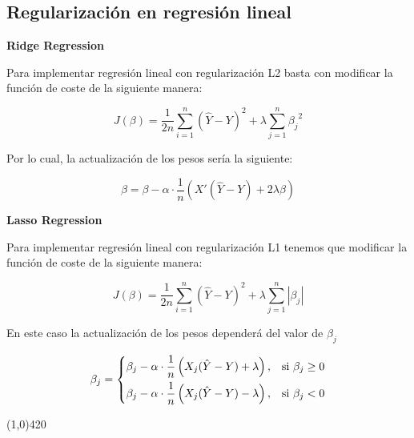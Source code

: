 \documentclass[11pt,fleqn]{book} %
\begin{document}
\FloatBarrier

\subsection{Regularización en regresión lineal} 

\textbf{Ridge Regression}

Para implementar regresión lineal con regularización L2 basta con modificar la función de coste de la siguiente manera:

\begin{equation}
\label{eqn:mean_squared_error_modified_l2}
J(\beta)=\frac{1}{2n} \sum_{i=1}^{n}\left (\hat{Y} - Y  \right )^{2} + \lambda \sum_{j=1}^{n} {\beta_{j}}^{2}
\end{equation}

Por lo cual, la actualización de los pesos sería la siguiente:

\begin{equation}
\label{eqn:linear_regression_gradient_descent_l2}
\beta = \beta - \alpha \cdot \frac{1}{n} \left ( X' (\hat{Y}-Y ) + 2 \lambda \beta \right )
\end{equation}

\textbf{Lasso Regression}

Para implementar regresión lineal con regularización L1 tenemos que modificar la función de coste de la siguiente manera:

\begin{equation}
\label{eqn:mean_squared_error_modified_l1}
J(\beta)=\frac{1}{2n} \sum_{i=1}^{n}\left (\hat{Y} - Y  \right )^{2} + \lambda \sum_{j=1}^{n} {|\beta_{j}|}
\end{equation}

En este caso la actualización de los pesos dependerá del valor de $\beta_{j}$

\begin{equation}
\label{eqn:linear_regression_gradient_descent_l1}
    \beta_j= 
\begin{dcases}
    \beta_j - \alpha \cdot \frac{1}{n} \left ( X_j (\hat{Y}-Y ) + \lambda \right ),& \text{si } \beta_j \geq 0\\
    \beta_j - \alpha \cdot \frac{1}{n} \left ( X_j (\hat{Y}-Y ) - \lambda \right ),              & \text{si } \beta_j < 0
\end{dcases} 
\end{equation}

\begin{center}
\line(1,0){420}
\end{center}
\end{document}
